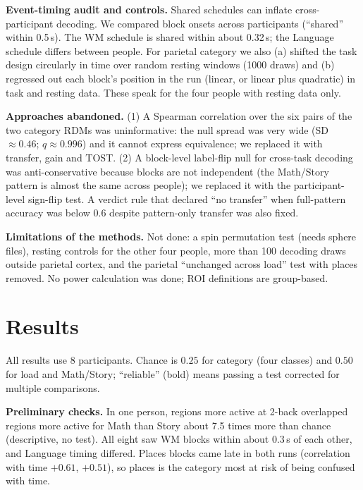 \documentclass[conference]{IEEEtran}
\newcommand{\Nsub}{8}
\begin{document}
\textbf{Event-timing audit and controls.} Shared schedules can inflate cross-participant decoding. We compared block onsets across participants (``shared'' within 0.5\,s). The WM schedule is shared within about 0.32\,s; the Language schedule differs between people. For parietal category we also (a) shifted the task design circularly in time over random resting windows (1000 draws) and (b) regressed out each block's position in the run (linear, or linear plus quadratic) in task and resting data. These speak for the four people with resting data only.

\textbf{Approaches abandoned.} (1) A Spearman correlation over the six pairs of the two category RDMs was uninformative: the null spread was very wide (SD $\approx0.46$; $q\approx0.996$) and it cannot express equivalence; we replaced it with transfer, gain and TOST. (2) A block-level label-flip null for cross-task decoding was anti-conservative because blocks are not independent (the Math/Story pattern is almost the same across people); we replaced it with the participant-level sign-flip test. A verdict rule that declared ``no transfer'' when full-pattern accuracy was below 0.6 despite pattern-only transfer was also fixed.

\textbf{Limitations of the methods.} Not done: a spin permutation test (needs sphere files), resting controls for the other four people, more than 100 decoding draws outside parietal cortex, and the parietal ``unchanged across load'' test with places removed. No power calculation was done; ROI definitions are group-based.

\section{Results}
All results use \Nsub{} participants. Chance is $0.25$ for category (four classes) and $0.50$ for load and Math/Story; ``reliable'' (bold) means passing a test corrected for multiple comparisons.

\textbf{Preliminary checks.} In one person, regions more active at 2-back overlapped regions more active for Math than Story about 7.5 times more than chance (descriptive, no test). All eight saw WM blocks within about 0.3\,s of each other, and Language timing differed. Places blocks came late in both runs (correlation with time $+0.61$, $+0.51$), so places is the category most at risk of being confused with time.
\end{document}
